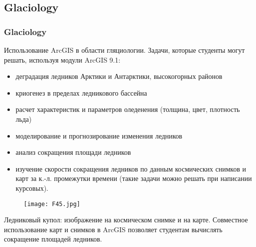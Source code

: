 \documentclass[pdflatex,compress,8pt,
	xcolor={dvipsnames,dvipsnames,svgnames,x11names,table},
	hyperref={	 
	pdfauthor={Lemenkova Polina}, 
	pdfsubject={Preentation}, 
	pdfcreator={Lemenkova Polina}, 
	pdfproducer={Lemenkova Polina}, 
	colorlinks=true,
	linkcolor=Red3, 
	citecolor=NavyBlue, 
	urlcolor = NavyBlue, 
	breaklinks = true}]{beamer}
\begin{document}
\subsection{Glaciology}
\begin{frame}\frametitle{Glaciology}
\small{
Использование ArcGIS в области гляциологии. Задачи, которые студенты могут решать, используя модули ArcGIS 9.1:
\begin{itemize}
	\item деградация ледников Арктики и Антарктики, высокогорных районов 
	\item криогенез в пределах ледникового бассейна
	\item расчет характеристик и параметров оледенения (толщина, цвет, плотность льда) 
	\item моделирование и прогнозирование изменения ледников
	\item анализ сокращения площади ледников
	\item изучение скорости сокращения ледников по данным космических снимков и карт за к.-л.
 промежутки времени (такие задачи можно решать при написании курсовых).
\end{itemize}
}
\begin{figure}[H]
	\centering
		\texttt{[image: F45.jpg]}
\end{figure}
\small{
Ледниковый купол: изображение на космическом снимке и на карте. Совместное использование карт и снимков в ArcGIS позволяет студентам вычислять сокращение площадей ледников.
}
\end{frame}
\end{document}
